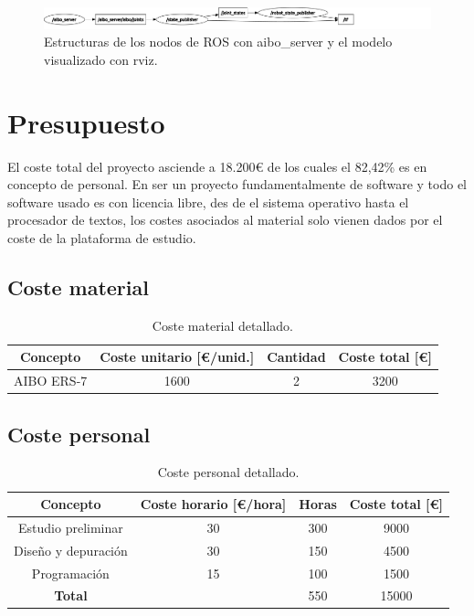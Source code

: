 \documentclass[12pt,a4paper,final,twoside]{book}
\begin{document}
\begin{figure}[H]
	\centering
    \includegraphics[scale=0.26]{images/graphModel.pdf}
	 \caption{Estructuras de los nodos de ROS con aibo{\_}server y el modelo visualizado con rviz.}
  \label{fig:aibostack}
\end{figure}
\newpage

\chapter{Presupuesto}
\thispagestyle{fancy}
El coste total del proyecto asciende a 18.200{\euro} de los cuales el 82,42{\%} es en concepto de personal. En ser un proyecto fundamentalmente de software y todo el software usado es con licencia libre, des de el sistema operativo hasta el procesador de textos, los costes asociados al material solo vienen dados por el coste de la plataforma de estudio.

\section{Coste material}

\begin{table}[H]
\begin{center}
\begin{tabulary}{\textwidth}{|C|C|C|C|}
\hline
\textbf{Concepto}&\textbf{Coste unitario [{\euro}/unid.]} & \textbf{Cantidad} & \textbf{Coste total [\euro]} \\ \hline
AIBO ERS-7 & 1600& 2& 3200 \\ \hline

\end{tabulary}
\end{center}
\caption{Coste material detallado.\label{costmat}}
\end{table}
\section{Coste personal}
\begin{table}[H]
\begin{center}
\begin{tabulary}{\textwidth}{|C|C|C|C|}
\hline
\textbf{Concepto}&\textbf{Coste horario [{\euro}/hora]} & \textbf{Horas} & \textbf{Coste total [\euro]} \\ \hline
Estudio preliminar & 30& 300& 9000 \\ \hline
Diseño y depuración & 30& 150& 4500 \\ \hline
Programación& 15& 100& 1500 \\ \hline
\textbf{Total}& & 550& 15000 \\ \hline
\end{tabulary}
\end{center}
\caption{Coste personal detallado.\label{costper}}
\end{table}
\end{document}
